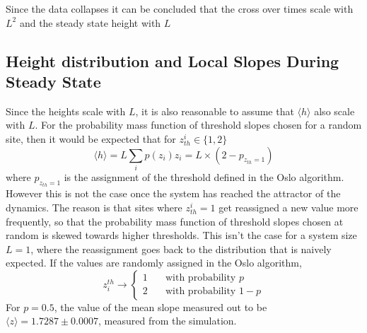 \documentclass[twoside]{article}
\begin{document}
Since the data collapses it can be concluded that the cross over times scale with $L^2$ and the steady state height with $L$

\subsection{Height distribution and Local Slopes During Steady State}
Since the heights scale with $L$, it is also reasonable to assume that $\langle h \rangle$ also scale with $L$. For the probability mass function of threshold slopes chosen for a random site, then it would be expected that for $z_{th}^i \in \{ 1,2 \} $
\[
\langle h \rangle = L \sum_i p(z_i) z_i = L \times (2-p_{z_{th} = 1} ) 
\]
where $p_{z_{th} = 1} $ is the assignment of the threshold defined in the Oslo algorithm. However this is not the case once the system has reached the attractor of the dynamics. The reason is that sites where $z_{th}^i = 1$ get reassigned a new value more frequently, so that the probability mass function of threshold slopes chosen at random is skewed towards higher thresholds. This isn't the case for a system size $L=1$, where the reassignment goes back to the distribution that is naively expected. If the values are randomly assigned in the Oslo algorithm,
\[
z_i^{th} \to \left\{ \begin{matrix} 1 & \quad \text{with probability } p \\ 2 & \quad \text{with probability } 1-p \end{matrix} \right.
\]
For $p=0.5$, the value of the mean slope measured out to be $\langle z \rangle=1.7287 \pm 0.0007$, measured from the simulation.
\end{document}

